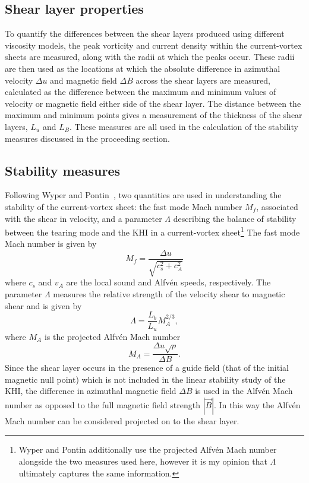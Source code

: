 \label{sec:khi_analysis}

\subsection{Shear layer properties}

To quantify the differences between the shear layers produced using different viscosity models, the peak vorticity and current density within the current-vortex sheets are measured, along with the radii at which the peaks occur. These radii are then used as the locations at which the absolute difference in azimuthal velocity $\Delta u$ and magnetic field $\Delta B$ across the shear layers are measured, calculated as the difference between the maximum and minimum values of velocity or magnetic field either side of the shear layer. The distance between the maximum and minimum points gives a measurement of the thickness of the shear layers, $L_u$ and $L_B$. These measures are all used in the calculation of the stability measures discussed in the proceeding section.

\subsection{Stability measures}

\label{sec:stability_measures}

Following Wyper and Pontin~\cite{wyperKelvinHelmholtzInstabilityCurrentvortex2013}, two quantities are used in understanding the stability of the current-vortex sheet: the fast mode Mach number $M_f$, associated with the shear in velocity, and a parameter $\Lambda$ describing the balance of stability between the tearing mode and the KHI in a current-vortex sheet\footnote{Wyper and Pontin additionally use the projected Alfv\'en Mach number alongside the two measures used here, however it is my opinion that $\Lambda$ ultimately captures the same information.} The fast mode Mach number is given by
\begin{equation}
  \label{eq:mach_numbers}
  M_f = \frac{\Delta u}{\sqrt{c_s^2 + c_A^2}}
\end{equation}
where $c_s$ and $v_A$ are the local sound and Alfv\'en speeds, respectively. The parameter $\Lambda$ measures the relative strength of the velocity shear to magnetic shear and is given by
\begin{equation}
  \label{eq:khi_stability_param}
  \Lambda = \frac{L_b}{L_u} M_A^{2/3},
\end{equation}
where $M_A$ is the projected Alfv\'en Mach number
\begin{equation}
  \label{eq:alfven_mach_number}
M_A = \frac{\Delta u \sqrt{\rho}}{\Delta B}.
\end{equation}
Since the shear layer occurs in the presence of a guide field (that of the initial magnetic null point) which is not included in the linear stability study of the KHI, the difference in azimuthal magnetic field $\Delta B$ is used in the Alfv\'en Mach number as opposed to the full magnetic field strength $|\vec{B}|$. In this way the Alfv\'en Mach number can be considered projected on to the shear layer. 

